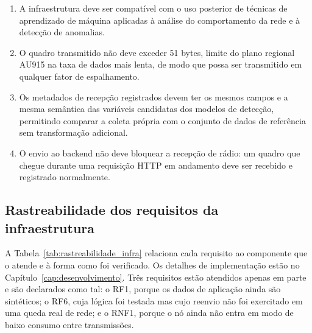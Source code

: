 \begin{enumerate}
    \item[RNF8.] A infraestrutura deve ser compatível com o uso posterior de técnicas de aprendizado de máquina aplicadas à análise do comportamento da rede e à detecção de anomalias.
    
    \item[RNF9.] O quadro transmitido não deve exceder 51 bytes, limite do plano regional AU915 na taxa de dados mais lenta, de modo que possa ser transmitido em qualquer fator de espalhamento.

    \item[RNF10.] Os metadados de recepção registrados devem ter os mesmos campos e a mesma semântica das variáveis candidatas dos modelos de detecção, permitindo comparar a coleta própria com o conjunto de dados de referência sem transformação adicional.

    \item[RNF11.] O envio ao backend não deve bloquear a recepção de rádio: um quadro que chegue durante uma requisição HTTP em andamento deve ser recebido e registrado normalmente.

\end{enumerate}


\subsection{Rastreabilidade dos requisitos da infraestrutura}
\label{subsec:rastreabilidade_infra}

A Tabela~\ref{tab:rastreabilidade_infra} relaciona cada requisito ao componente que o atende e à forma como foi verificado. Os detalhes de implementação estão no Capítulo~\ref{cap:desenvolvimento}. Três requisitos estão atendidos apenas em parte e são declarados como tal: o RF1, porque os dados de aplicação ainda são sintéticos; o RF6, cuja lógica foi testada mas cujo reenvio não foi exercitado em uma queda real de rede; e o RNF1, porque o nó ainda não entra em modo de baixo consumo entre transmissões.

